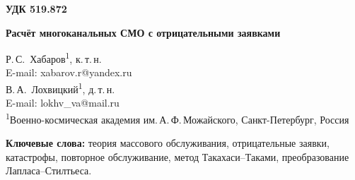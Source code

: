 \documentclass[a4paper,12pt]{article}
\begin{document}
\noindent\textbf{УДК 519.872}
\vspace{1em}

\begin{center}
{\Large\bfseries Расчёт многоканальных СМО с отрицательными заявками}
\end{center}
\vspace{0.8em}

\begin{center}
Р.\,С.~Хабаров\textsuperscript{1}, к.\,т.\,н.\\[2pt]
E-mail: xabarov.r@yandex.ru\\[6pt]
В.\,А.~Лохвицкий\textsuperscript{1}, д.\,т.\,н.\\[2pt]
E-mail: lokhv\_va@mail.ru\\[8pt]
{\small\textsuperscript{1}Военно-космическая академия им.\,А.\,Ф.\,Можайского, Санкт-Петербург, Россия}
\end{center}
\vspace{0.5em}

\begin{abstract}
Рассматривается расчёт многоканальных систем массового обслуживания с пуассоновскими потоками положительных и отрицательных заявок. Исследуются удаление одной обслуживаемой заявки и мгновенное очищение системы. Для двухфазного гиперэкспоненциального обслуживания описаны матрицы переходов и вычисление стационарных вероятностей методом Такахаси--Таками. Получены выражения для преобразований Лапласа--Стилтьеса времени ожидания, а для модели с очищением --- также времени пребывания. Повторы с новой длительностью описываются переходами между фазами. Для общих прерываний с сохранённой длительностью построена совместная модель, учитывающая первоначальный объём и выполненную часть работы каждой обслуживаемой заявки. Предложена её конечная фазовая аппроксимация с численной проверкой уточнений. В обоих вариантах общих прерываний сохраняется зависимость каналов. Для выборочных прерываний с сохранённой длительностью используется приближение эффективного обслуживания. Проведены проверки по уравнениям баланса, закону Литтла и независимой имитации. Указаны ограничения приближений и условия существования моментов.
\end{abstract}
\textbf{Ключевые слова:} теория массового обслуживания, отрицательные заявки, катастрофы, повторное обслуживание, метод Такахаси--Таками, преобразование Лапласа--Стилтьеса.
\end{document}
